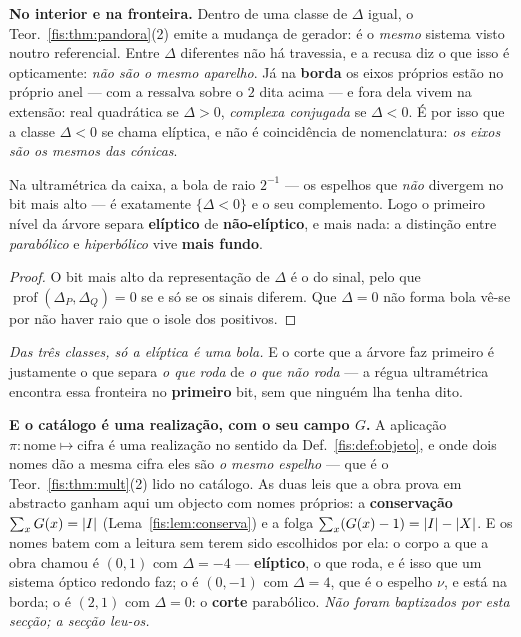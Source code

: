 \documentclass[livro.tex]{subfiles}
\begin{document}
\medskip\noindent\textbf{No interior e na fronteira.} Dentro de uma classe de
$\Delta$ igual, o Teor.~\ref{fis:thm:pandora}(2) emite a mudança de gerador: é o
\emph{mesmo} sistema visto noutro referencial. Entre $\Delta$ diferentes não há
travessia, e a recusa diz o que isso é opticamente: \emph{não são o mesmo
aparelho}. Já na \textbf{borda} os eixos próprios estão no próprio anel --- com a
ressalva sobre o $2$ dita acima --- e fora dela vivem na extensão: real
quadrática se $\Delta>0$, \emph{complexa conjugada} se $\Delta<0$. É por isso que a classe $\Delta<0$ se chama elíptica, e não é
coincidência de nomenclatura: \emph{os eixos são os mesmos das cónicas}.

\begin{corolario}\label{fis:cor:pandbola}
Na ultramétrica da caixa, a bola de raio $2^{-1}$ --- os espelhos que \emph{não} divergem no bit mais alto --- é exatamente $\{\Delta<0\}$ e o seu complemento.
Logo o primeiro nível da árvore separa \textbf{elíptico} de
\textbf{não-elíptico}, e mais nada: a distinção entre \emph{parabólico} e
\emph{hiperbólico} vive \textbf{mais fundo}.
\end{corolario}

\begin{proof}
O bit mais alto da representação de $\Delta$ é o do sinal, pelo que
$\operatorname{prof}(\Delta_P,\Delta_Q)=0$ se e só se os sinais diferem. Que
$\Delta=0$ não forma bola vê-se por não haver raio que o isole dos positivos.
\end{proof}

\medskip\noindent \emph{Das três classes, só a elíptica é uma bola.} E o corte
que a árvore faz primeiro é justamente o que separa \emph{o que roda} de \emph{o
que não roda} --- a régua ultramétrica encontra essa fronteira no
\textbf{primeiro} bit, sem que ninguém lha tenha dito.

\medskip\noindent\textbf{E o catálogo é uma realização, com o seu campo $G$.} A
aplicação $\pi\colon\text{nome}\mapsto\text{cifra}$ é uma realização no sentido da
Def.~\ref{fis:def:objeto}, e onde dois nomes dão a mesma cifra eles são \emph{o
mesmo espelho} --- que é o Teor.~\ref{fis:thm:mult}(2) lido no catálogo. As duas
leis que a obra prova em abstracto ganham aqui um objecto com nomes próprios: a
\textbf{conservação} $\sum_x G(x)=\lvert I\rvert$ (Lema~\ref{fis:lem:conserva}) e a folga
$\sum_x(G(x)-1)=\lvert I\rvert-\lvert X\rvert$. E os
nomes batem com a leitura sem terem sido escolhidos por ela: o corpo a que a obra
chamou  é $(0,1)$ com $\Delta=-4$ --- \textbf{elíptico}, o que roda,
e é isso que um sistema óptico redondo faz; o  é $(0,-1)$ com
$\Delta=4$, que é o espelho $\nu$, e está na borda; o  é $(2,1)$
com $\Delta=0$: o \textbf{corte} parabólico. \emph{Não foram baptizados por esta
secção; a secção leu-os.}
\end{document}
